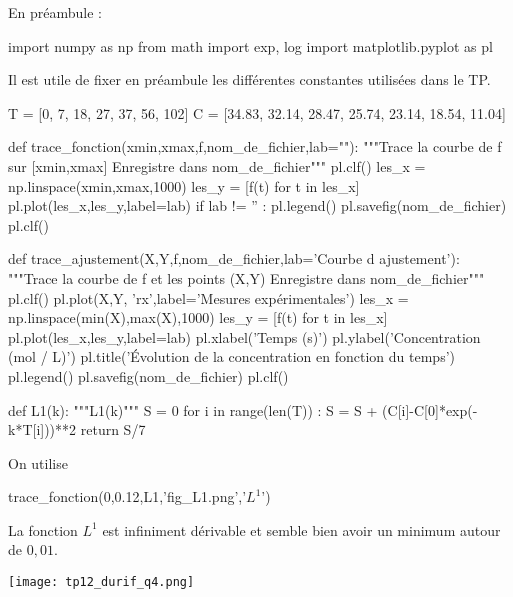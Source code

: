 En préambule : 
\begin{pyverbatim}
import numpy as np
from math import exp, log
import matplotlib.pyplot as pl
\end{pyverbatim}

Il est utile de fixer en préambule les différentes constantes utilisées dans le TP.
\begin{pyverbatim}
T = [0, 7, 18, 27, 37, 56, 102]
C = [34.83, 32.14, 28.47, 25.74, 23.14, 18.54, 11.04]
\end{pyverbatim}

\question{}
\begin{pyverbatim}
def trace_fonction(xmin,xmax,f,nom_de_fichier,lab=""):
    """Trace la courbe de f sur [xmin,xmax]
    Enregistre dans nom_de_fichier"""
    pl.clf()
    les_x = np.linspace(xmin,xmax,1000)
    les_y = [f(t) for t in les_x]
    pl.plot(les_x,les_y,label=lab)
    if lab != '' :
        pl.legend()
    pl.savefig(nom_de_fichier)
    pl.clf()
\end{pyverbatim}



\question{}
\begin{pyverbatim}
def trace_ajustement(X,Y,f,nom_de_fichier,lab='Courbe d ajustement'):
    """Trace la courbe de f et les points (X,Y)
    Enregistre dans nom_de_fichier"""
    pl.clf()
    pl.plot(X,Y, 'rx',label='Mesures expérimentales')
    les_x = np.linspace(min(X),max(X),1000)
    les_y = [f(t) for t in les_x]
    pl.plot(les_x,les_y,label=lab)
    pl.xlabel('Temps (s)')
    pl.ylabel('Concentration (mol / L)')
    pl.title('Évolution de la concentration en fonction du temps')
    pl.legend()
    pl.savefig(nom_de_fichier)
    pl.clf()
\end{pyverbatim}

\question{}
\begin{pyverbatim}
def L1(k):
    """L1(k)"""
    S = 0
    for i in range(len(T)) :
        S = S + (C[i]-C[0]*exp(-k*T[i]))**2
    return S/7
\end{pyverbatim}

\question{}
On utilise
\begin{pyverbatim}
trace_fonction(0,0.12,L1,'fig_L1.png','$L^1$')
\end{pyverbatim}
La fonction $L^1$ est infiniment dérivable et semble bien avoir un minimum autour de $0,01$.

\begin{center}
\texttt{[image: tp12\_durif\_q4.png]}
\end{center}


